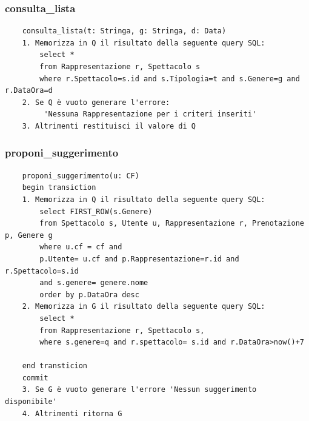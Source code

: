 \documentclass[12pt, letterpaper]{article}
\begin{document}
\subsubsection{consulta\_lista}
\begin{verbatim}
    consulta_lista(t: Stringa, g: Stringa, d: Data)
    1. Memorizza in Q il risultato della seguente query SQL:
        select *
        from Rappresentazione r, Spettacolo s
        where r.Spettacolo=s.id and s.Tipologia=t and s.Genere=g and r.DataOra=d
    2. Se Q è vuoto generare l'errore:
         'Nessuna Rappresentazione per i criteri inseriti'
    3. Altrimenti restituisci il valore di Q
\end{verbatim}\newpage
\subsubsection{proponi\_suggerimento}
\begin{verbatim}
    proponi_suggerimento(u: CF)
    begin transiction
    1. Memorizza in Q il risultato della seguente query SQL:
        select FIRST_ROW(s.Genere)
        from Spettacolo s, Utente u, Rappresentazione r, Prenotazione p, Genere g
        where u.cf = cf and 
        p.Utente= u.cf and p.Rappresentazione=r.id and r.Spettacolo=s.id
        and s.genere= genere.nome
        order by p.DataOra desc
    2. Memorizza in G il risultato della seguente query SQL:
        select *
        from Rappresentazione r, Spettacolo s, 
        where s.genere=q and r.spettacolo= s.id and r.DataOra>now()+7

    end transticion
    commit
    3. Se G è vuoto generare l'errore 'Nessun suggerimento disponibile'
    4. Altrimenti ritorna G

\end{verbatim}
\end{document}
